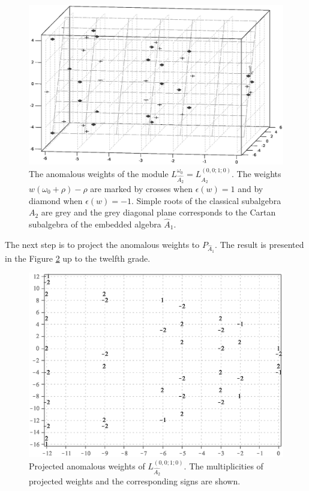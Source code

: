 \documentclass[12pt]{iopart}
\theoremstyle{definition}
\begin{document}
\begin{figure}[h!tb]
  \includegraphics[width=140mm]{figure7.eps}
  \caption{The anomalous weights of the module $L_{\hat{A_2}}^{\omega_0}=L^{(0,0;1;0)}_{\hat{A_2}}$. The weights $w (\omega_0+\rho)-\rho$ are marked by crosses when $\epsilon(w)=1$ and
by diamond when $\epsilon(w)=-1$. Simple roots of the classical subalgebra $A_2$ are
grey and the grey diagonal plane corresponds to the Cartan subalgebra of
the embedded algebra $\hat{A}_1$.}
  \label{fig:affine_A2_anom_point}
\end{figure}

The next step is to project the anomalous weights to $P_{\hat A_1}$.
The result is presented in the Figure \ref{fig:AffineA2_A1_anom_proj} up to the twelfth grade.
\begin{figure}[h!tb]
  \centering
  \includegraphics[width=130mm]{figure8.eps}
  \caption{Projected anomalous weights of $L^{(0,0;1;0)}_{\hat{A_2}}$. The multiplicities of projected weights and the corresponding signs are shown. }
  \label{fig:AffineA2_A1_anom_proj}
\end{figure}
\end{document}
